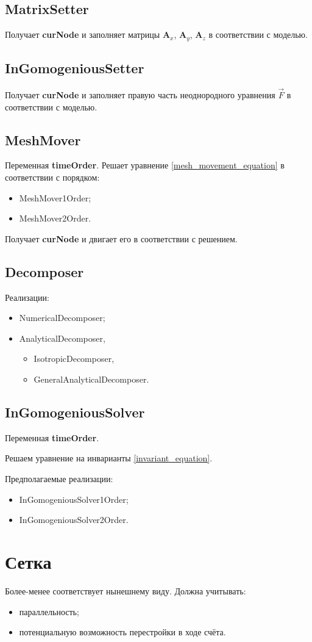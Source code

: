 \documentclass[a4paper,12pt]{article}
\numberwithin{equation}{section}
\begin{document}
\subsection{MatrixSetter}
	Получает \textbf{curNode} и заполняет матрицы $\mathbf{A}_x$, $\mathbf{A}_y$, $\mathbf{A}_z$ в соответствии с моделью.
	
\subsection{InGomogeniousSetter}
	Получает \textbf{curNode} и заполняет правую часть неоднородного уравнения $\vec{F}$ в соответствии с моделью.
	
\subsection{MeshMover}
	Переменная \textbf{timeOrder}.
	Решает уравнение \eqref{mesh_movement_equation} в соответствии с порядком:
	\begin{itemize}
		\item{MeshMover1Order;}
		\item{MeshMover2Order.}
	\end{itemize}	
	
	Получает \textbf{curNode} и двигает его в соответствии с решением.

\subsection{Decomposer}
	Реализации:
	\begin{itemize}
			\item{NumericalDecomposer;}
			\item{AnalyticalDecomposer,}
			\begin{itemize}
					\item{IsotropicDecomposer,}
					\item{GeneralAnalyticalDecomposer.}
			\end{itemize}
	\end{itemize}

\subsection{InGomogeniousSolver}
	Переменная \textbf{timeOrder}.
	
	Решаем уравнение на инварианты \eqref{invariant_equation}.
	
	Предполагаемые реализации:
		\begin{itemize}
			\item{InGomogeniousSolver1Order;}
			\item{InGomogeniousSolver2Order.}
		\end{itemize}


\section{Сетка}

Более-менее соответствует нынешнему виду. Должна учитывать: 
	\begin{itemize}
		\item{параллельность;}
		\item{потенциальную возможность перестройки в ходе счёта.}
	\end{itemize}
\end{document}

